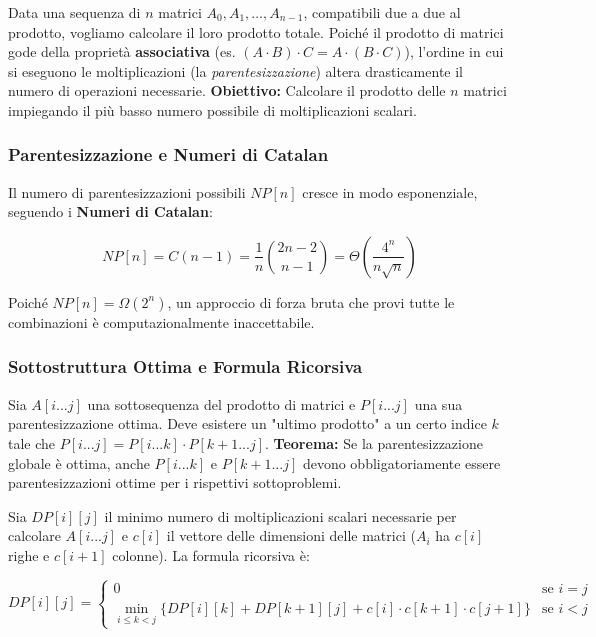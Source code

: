 \documentclass[12pt, a4paper]{article}
\begin{document}
\begin{tcolorbox}[colback=lightergray!10, colframe=tocsec, title=\textbf{Definizione del Problema}]
Data una sequenza di $n$ matrici $A_0, A_1, \dots, A_{n-1}$, compatibili due a due al prodotto, vogliamo calcolare il loro prodotto totale.
Poiché il prodotto di matrici gode della proprietà \textbf{associativa} (es. $(A \cdot B) \cdot C = A \cdot (B \cdot C)$), l'ordine in cui si eseguono le moltiplicazioni (la \textit{parentesizzazione}) altera drasticamente il numero di operazioni necessarie.
\textbf{Obiettivo:} Calcolare il prodotto delle $n$ matrici impiegando il più basso numero possibile di moltiplicazioni scalari.
\end{tcolorbox}

\subsubsection{Parentesizzazione e Numeri di Catalan}
Il numero di parentesizzazioni possibili $NP[n]$ cresce in modo esponenziale, seguendo i \textbf{Numeri di Catalan}:


$$NP[n] = C(n-1) = \frac{1}{n} \binom{2n-2}{n-1} = \Theta\left(\frac{4^n}{n\sqrt{n}}\right)$$


Poiché $NP[n] = \Omega(2^n)$, un approccio di forza bruta che provi tutte le combinazioni è computazionalmente inaccettabile.

\subsubsection{Sottostruttura Ottima e Formula Ricorsiva}
Sia $A[i...j]$ una sottosequenza del prodotto di matrici e $P[i...j]$ una sua parentesizzazione ottima. Deve esistere un "ultimo prodotto" a un certo indice $k$ tale che $P[i...j] = P[i...k] \cdot P[k+1...j]$.
\textbf{Teorema:} Se la parentesizzazione globale è ottima, anche $P[i...k]$ e $P[k+1...j]$ devono obbligatoriamente essere parentesizzazioni ottime per i rispettivi sottoproblemi.

Sia $DP[i][j]$ il minimo numero di moltiplicazioni scalari necessarie per calcolare $A[i...j]$ e $c[i]$ il vettore delle dimensioni delle matrici ($A_i$ ha $c[i]$ righe e $c[i+1]$ colonne). La formula ricorsiva è:


$$DP[i][j] = \begin{cases} 0 & \text{se } i=j \\ \min_{i \le k < j} \{ DP[i][k] + DP[k+1][j] + c[i] \cdot c[k+1] \cdot c[j+1] \} & \text{se } i < j \end{cases}$$
\end{document}
